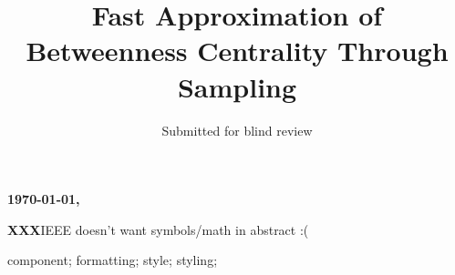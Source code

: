 \documentclass[10pt, conference, compsocconf]{IEEEtran}
\def\XXX{{\bf XXX}}
\begin{document}
\title{Fast Approximation of Betweenness Centrality Through Sampling}
\author{Submitted for blind review}
\maketitle

{\bf \large \today, \currenttime}

\XXX IEEE doesn't want symbols/math in abstract :(


\begin{IEEEkeywords}
component; formatting; style; styling;

\end{IEEEkeywords}










%
%


\end{document}
